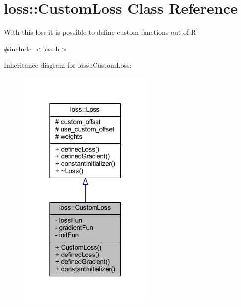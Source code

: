 \hypertarget{classloss_1_1_custom_loss}{}\section{loss\+:\+:Custom\+Loss Class Reference}
\label{classloss_1_1_custom_loss}


With this loss it is possible to define custom functions out of {\ttfamily R}  




{\ttfamily \#include $<$loss.\+h$>$}



Inheritance diagram for loss\+:\+:Custom\+Loss\+:\nopagebreak
\begin{figure}[H]
\begin{center}
\leavevmode
\includegraphics[width=187pt]{classloss_1_1_custom_loss__inherit__graph}
\end{center}
\end{figure}


